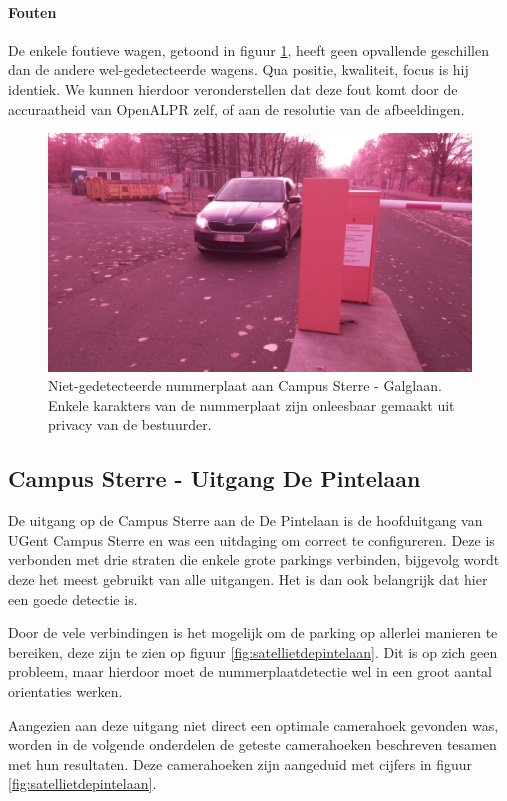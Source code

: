 \paragraph{Fouten}
De enkele foutieve wagen, getoond in figuur \ref{foutiefgalglaan}, heeft geen opvallende geschillen dan de andere wel-gedetecteerde wagens. Qua positie, kwaliteit, focus is hij identiek. We kunnen hierdoor veronderstellen dat deze fout komt door de accuraatheid van OpenALPR zelf, of aan de resolutie van de afbeeldingen.
\begin{figure}[h!]
	\centering
	\includegraphics[width=0.5\linewidth]{img/res-galglaan/galg1.jpg}
	\caption{Niet-gedetecteerde nummerplaat aan Campus Sterre - Galglaan. Enkele karakters van de nummerplaat zijn onleesbaar gemaakt uit privacy van de bestuurder.}
	\label{foutiefgalglaan}
\end{figure}

\subsection{Campus Sterre - Uitgang De Pintelaan}
De uitgang op de Campus Sterre aan de De Pintelaan is de hoofduitgang van UGent Campus Sterre en was een uitdaging om correct te configureren. Deze is verbonden met drie straten die enkele grote parkings verbinden, bijgevolg wordt deze het meest gebruikt van alle uitgangen. Het is dan ook belangrijk dat hier een goede detectie is.

Door de vele verbindingen is het mogelijk om de parking op allerlei manieren te bereiken, deze zijn te zien op figuur \ref{fig:satellietdepintelaan}. Dit is op zich geen probleem, maar hierdoor moet de nummerplaatdetectie wel in een groot aantal orientaties werken.

Aangezien aan deze uitgang niet direct een optimale camerahoek gevonden was, worden in de volgende onderdelen de geteste camerahoeken beschreven tesamen met hun resultaten. Deze camerahoeken zijn aangeduid met cijfers in figuur \ref{fig:satellietdepintelaan}.


